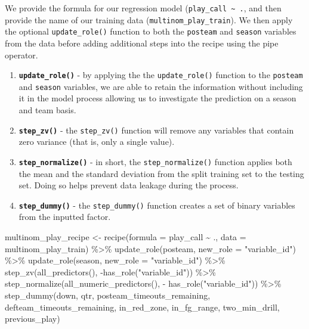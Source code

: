 \documentclass[
  letterpaper,
]{krantz}
\newenvironment{Shaded}{\begin{snugshade}}{\end{snugshade}}
\newcommand{\AttributeTok}[1]{\textcolor[rgb]{0.40,0.45,0.13}{#1}}
\newcommand{\FunctionTok}[1]{\textcolor[rgb]{0.28,0.35,0.67}{#1}}
\newcommand{\NormalTok}[1]{\textcolor[rgb]{0.00,0.23,0.31}{#1}}
\newcommand{\OtherTok}[1]{\textcolor[rgb]{0.00,0.23,0.31}{#1}}
\newcommand{\SpecialCharTok}[1]{\textcolor[rgb]{0.37,0.37,0.37}{#1}}
\newcommand{\StringTok}[1]{\textcolor[rgb]{0.13,0.47,0.30}{#1}}
\providecommand{\tightlist}{%
  \setlength{\itemsep}{0pt}\setlength{\parskip}{0pt}}\usepackage{longtable,booktabs,array}
\begin{document}
We provide the formula for our regression model
(\texttt{play\_call\ \textasciitilde{}\ .}, and then provide the name of
our training data (\texttt{multinom\_play\_train}). We then apply the
optional \texttt{update\_role()} function to both the \texttt{posteam}
and \texttt{season} variables from the data before adding additional
steps into the recipe using the pipe operator.

\begin{enumerate}
\def\labelenumi{\arabic{enumi}.}
\tightlist
\item
  \textbf{\texttt{update\_role()}} - by applying the the
  \texttt{update\_role()} function to the \texttt{posteam} and
  \texttt{season} variables, we are able to retain the information
  without including it in the model process allowing us to investigate
  the prediction on a season and team basis.
\item
  \textbf{\texttt{step\_zv()}} - the \texttt{step\_zv()} function will
  remove any variables that contain zero variance (that is, only a
  single value).
\item
  \textbf{\texttt{step\_normalize()}} - in short, the
  \texttt{step\_normalize()} function applies both the mean and the
  standard deviation from the split training set to the testing set.
  Doing so helps prevent data leakage during the process.
\item
  \textbf{\texttt{step\_dummy()}} - the \texttt{step\_dummy()} function
  creates a set of binary variables from the inputted factor.
\end{enumerate}

\begin{Shaded}
\begin{Highlighting}[]
\NormalTok{multinom\_play\_recipe }\OtherTok{\textless{}{-}} 
  \FunctionTok{recipe}\NormalTok{(}\AttributeTok{formula =}\NormalTok{ play\_call }\SpecialCharTok{\textasciitilde{}}\NormalTok{ ., }\AttributeTok{data =}\NormalTok{ multinom\_play\_train) }\SpecialCharTok{\%\textgreater{}\%}
  \FunctionTok{update\_role}\NormalTok{(posteam, }\AttributeTok{new\_role =} \StringTok{"variable\_id"}\NormalTok{) }\SpecialCharTok{\%\textgreater{}\%}
  \FunctionTok{update\_role}\NormalTok{(season, }\AttributeTok{new\_role =} \StringTok{"variable\_id"}\NormalTok{) }\SpecialCharTok{\%\textgreater{}\%}
  \FunctionTok{step\_zv}\NormalTok{(}\FunctionTok{all\_predictors}\NormalTok{(),}
          \SpecialCharTok{{-}}\FunctionTok{has\_role}\NormalTok{(}\StringTok{"variable\_id"}\NormalTok{)) }\SpecialCharTok{\%\textgreater{}\%} 
  \FunctionTok{step\_normalize}\NormalTok{(}\FunctionTok{all\_numeric\_predictors}\NormalTok{(),}
                 \SpecialCharTok{{-}} \FunctionTok{has\_role}\NormalTok{(}\StringTok{"variable\_id"}\NormalTok{)) }\SpecialCharTok{\%\textgreater{}\%}
  \FunctionTok{step\_dummy}\NormalTok{(down, qtr, posteam\_timeouts\_remaining,}
\NormalTok{             defteam\_timeouts\_remaining,}
\NormalTok{             in\_red\_zone, in\_fg\_range,}
\NormalTok{             two\_min\_drill, previous\_play)}
\end{Highlighting}
\end{Shaded}
\end{document}
